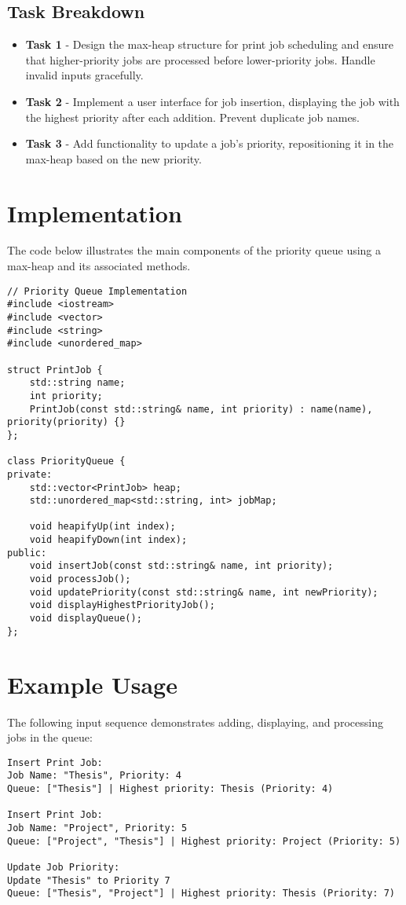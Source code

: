 \documentclass{article}
\begin{document}
\subsection{Task Breakdown}
\begin{itemize}
    \item \textbf{Task 1} - Design the max-heap structure for print job scheduling and ensure that higher-priority jobs are processed before lower-priority jobs. Handle invalid inputs gracefully.
    \item \textbf{Task 2} - Implement a user interface for job insertion, displaying the job with the highest priority after each addition. Prevent duplicate job names.
    \item \textbf{Task 3} - Add functionality to update a job's priority, repositioning it in the max-heap based on the new priority.
\end{itemize}

\section{Implementation}
The code below illustrates the main components of the priority queue using a max-heap and its associated methods.

\begin{lstlisting}
// Priority Queue Implementation
#include <iostream>
#include <vector>
#include <string>
#include <unordered_map>

struct PrintJob {
    std::string name;
    int priority;
    PrintJob(const std::string& name, int priority) : name(name), priority(priority) {}
};

class PriorityQueue {
private:
    std::vector<PrintJob> heap;
    std::unordered_map<std::string, int> jobMap;

    void heapifyUp(int index);
    void heapifyDown(int index);
public:
    void insertJob(const std::string& name, int priority);
    void processJob();
    void updatePriority(const std::string& name, int newPriority);
    void displayHighestPriorityJob();
    void displayQueue();
};
\end{lstlisting}

\section{Example Usage}
The following input sequence demonstrates adding, displaying, and processing jobs in the queue:

\begin{verbatim}
Insert Print Job:
Job Name: "Thesis", Priority: 4
Queue: ["Thesis"] | Highest priority: Thesis (Priority: 4)

Insert Print Job:
Job Name: "Project", Priority: 5
Queue: ["Project", "Thesis"] | Highest priority: Project (Priority: 5)

Update Job Priority:
Update "Thesis" to Priority 7
Queue: ["Thesis", "Project"] | Highest priority: Thesis (Priority: 7)
\end{verbatim}
\end{document}
